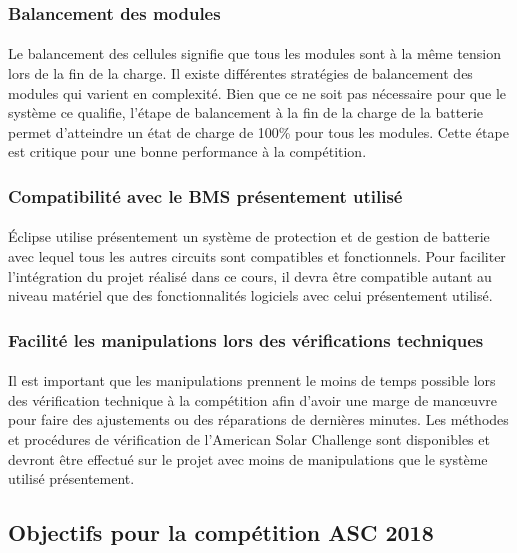 		\subsubsection{Balancement des modules}
		\paragraph{}
		Le balancement des cellules signifie que tous les modules sont à la même tension lors de la fin de la charge. Il existe différentes stratégies de balancement des modules qui varient en complexité. Bien que ce ne soit pas nécessaire pour que le système ce qualifie, l'étape de balancement à la fin de la charge de la batterie permet d'atteindre un état de charge de 100\% pour tous les modules. Cette étape est critique pour une bonne performance à la compétition. 
				
		\subsubsection{Compatibilité avec le BMS présentement utilisé}
		\paragraph{}
		Éclipse utilise présentement un système de protection et de gestion de batterie avec lequel tous les autres circuits sont compatibles et fonctionnels. Pour faciliter l'intégration du projet réalisé dans ce cours, il devra être compatible autant au niveau matériel que des fonctionnalités logiciels avec celui présentement utilisé.		
		
		\subsubsection{Facilité les manipulations lors des vérifications techniques}
		\paragraph{}
		Il est important que les manipulations prennent le moins de temps possible lors des vérification technique à la compétition afin d'avoir une marge de manœuvre pour faire des ajustements ou des réparations de dernières minutes. Les méthodes et procédures de vérification de l'American Solar Challenge sont disponibles et devront être effectué sur le projet avec moins de manipulations que le système utilisé présentement.
		
	\subsection{Objectifs pour la compétition ASC 2018}
